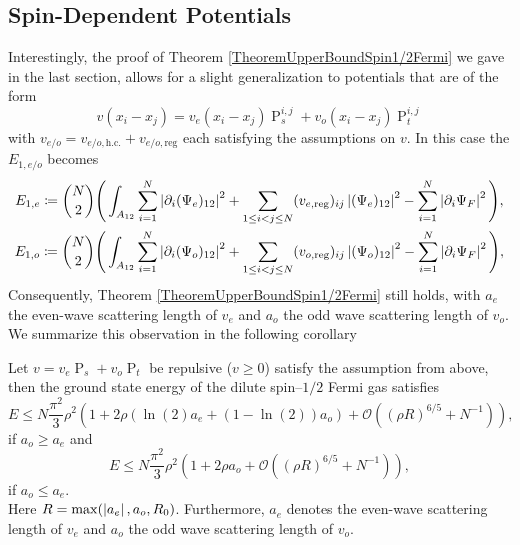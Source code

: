 \subsection{Spin-Dependent Potentials}
Interestingly, the proof of Theorem \ref{TheoremUpperBoundSpin1/2Fermi} we gave in the last section, allows for a slight generalization to potentials that are of the form \begin{equation}
v(x_i-x_j)=v_e(x_i-x_j) \operatorname{P}^{i,j}_s+v_o(x_i-x_j)\operatorname{P}^{i,j}_t
\end{equation} 
with $  v_{e/o}=v_{e/o,\text{h.c.}}+v_{e/o,\text{reg}} $ each satisfying the assumptions on $ v $. In this case the $ E_{1,e/o} $ becomes
\begin{equation}
\begin{aligned}
E_{1,e}\coloneqq\binom{N}{2}\Bigg(\int_{A_{12}}\sum_{i=1}^{N}\left\lvert \partial_i(\Psi_e)_{12} \right\rvert^2
&+\sum_{1\leq i<j\leq N}(v_{e,\text{reg}})_{ij}\left\lvert (\Psi_e)_{12} \right\rvert^2-\sum_{i=1}^{N}\left\lvert \partial_i \Psi_F \right\rvert^2\Bigg),\\
E_{1,o}\coloneqq\binom{N}{2}\Bigg(\int_{A_{12}}\sum_{i=1}^{N}\left\lvert \partial_i(\Psi_o)_{12} \right\rvert^2
&+\sum_{1\leq i<j\leq N}(v_{o,\text{reg}})_{ij}\left\lvert (\Psi_o)_{12} \right\rvert^2-\sum_{i=1}^{N}\left\lvert \partial_i \Psi_F \right\rvert^2\Bigg),
\end{aligned}
\end{equation}
Consequently, Theorem \ref{TheoremUpperBoundSpin1/2Fermi} still holds, with $ a_e $ the even-wave scattering length of $ v_e $ and $ a_o $ the odd wave scattering length of $ v_o $. We summarize this observation in the following corollary
\begin{corollary}\label{CorollaryUpperBoundSpin1/2FermiSpinDependent}
	Let $ v=v_e\operatorname{P}_s+v_o\operatorname{P}_t $ be repulsive ($ v\geq0 $) satisfy the assumption from above, then the ground state energy of the dilute spin--$ 1/2 $ Fermi gas satisfies\begin{equation}
	E\leq N\frac{\pi^2}{3}\rho^2\left(1+2\rho \left(\ln(2) a_e+(1-\ln(2))a_o\right)+\mathcal{O}\left((\rho R)^{6/5}+N^{-1}\right)\right),
	\end{equation}
	if $ a_o\geq a_e $ and 
	\begin{equation}
	E\leq N\frac{\pi^2}{3}\rho^2\left(1+2\rho a_o+\mathcal{O}\left((\rho R)^{6/5}+N^{-1}\right)\right),
	\end{equation}
	if $ a_o\leq a_e $.\\
	Here $ R=\max(\left\lvert a_e \right\rvert, a_o, R_0) $. Furthermore, $ a_e $ denotes the even-wave scattering length of $ v_e $ and $ a_o $ the odd wave scattering length of $ v_o $.
\end{corollary}
